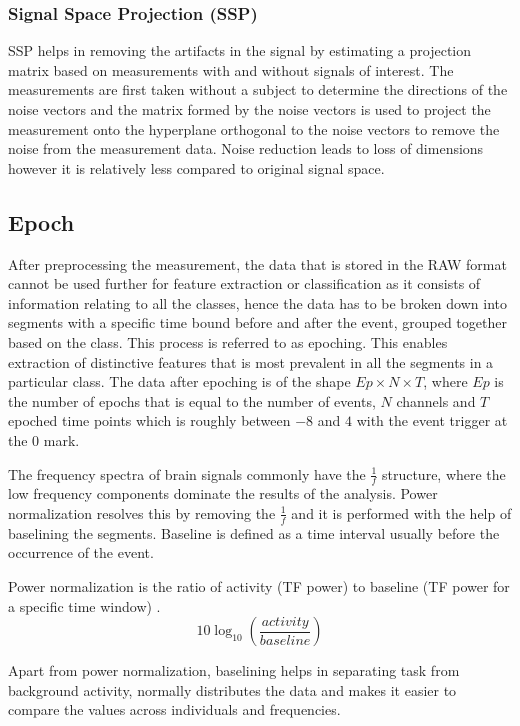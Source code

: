 \subsubsection{Signal Space Projection (SSP)}
SSP  helps in removing the artifacts in the signal by estimating a projection matrix based on measurements with and without signals of interest. The measurements are first taken without a subject to determine the directions of the noise vectors and the matrix formed by the noise vectors is used to project the measurement onto the hyperplane orthogonal to the noise vectors to remove the noise from the measurement data. Noise reduction leads to loss of dimensions however it is relatively less compared to original signal space.  

\subsection{Epoch}
After preprocessing the measurement, the data that is stored in the RAW format cannot be used further for feature extraction or classification as it consists of information relating to all the classes, hence the data has to be broken down into segments with a specific time bound before and after the event, grouped together based on the class. This process is referred to as epoching. This enables extraction of distinctive features that is most prevalent in all the segments in a particular class. The data after epoching is of the shape $Ep \times N \times T$, where  $Ep$ is the number of epochs that is equal to the number of events, $N$ channels and $T$ epoched time points which is roughly between $-8$ and $4$ with the event trigger at the $0$ mark.

The frequency spectra of brain signals commonly have the $\frac{1}{f}$ structure, where the low frequency components dominate the results of the analysis. Power normalization resolves this by removing the $\frac{1}{f}$ and it is performed with the help of baselining the segments. Baseline is defined as a time interval usually before the occurrence of the event.

Power normalization is the ratio of activity (TF power) to baseline (TF power for a specific time window) .
\begin{equation} \label{eq:bell}
    10\log_{10}(\frac{activity}{baseline})
\end{equation}

Apart from power normalization, baselining helps in separating task from background activity, normally distributes the data and makes it easier to compare the values across individuals and frequencies.


